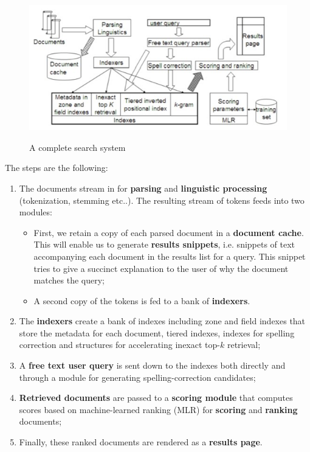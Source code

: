 \begin{figure}[h!]
		\centering
		\includegraphics[scale = 1.8]{img/complete system.jpg}
		\label{complete system}
        \caption{A complete search system}
\end{figure}

The steps are the following:

\begin{enumerate}
    \item The documents stream in for \textbf{parsing} and \textbf{linguistic processing} (tokenization, stemming etc..). The resulting stream of tokens feeds into two modules:

    \begin{itemize}
        \item First, we retain a copy of each parsed document in a \textbf{document cache}. This will enable us to generate \textbf{results snippets}, i.e. snippets of text accompanying each document in the results list for a query. This snippet tries to give a succinct explanation to the user of why the document matches the query;
        \item A second copy of the tokens is fed to a bank of \textbf{indexers}. 
    \end{itemize}

    \item The \textbf{indexers} create a bank of indexes including zone and field indexes that store the metadata for each document, tiered indexes, indexes for spelling correction and structures for accelerating inexact top-$k$ retrieval;
    \item A \textbf{free text user query} is sent down to the indexes both directly and through a module for generating spelling-correction candidates;
    \item \textbf{Retrieved documents} are passed to a \textbf{scoring module} that computes scores based on machine-learned ranking (MLR) for \textbf{scoring} and \textbf{ranking} documents;
    \item Finally, these ranked documents are rendered as a \textbf{results page}.
\end{enumerate}

